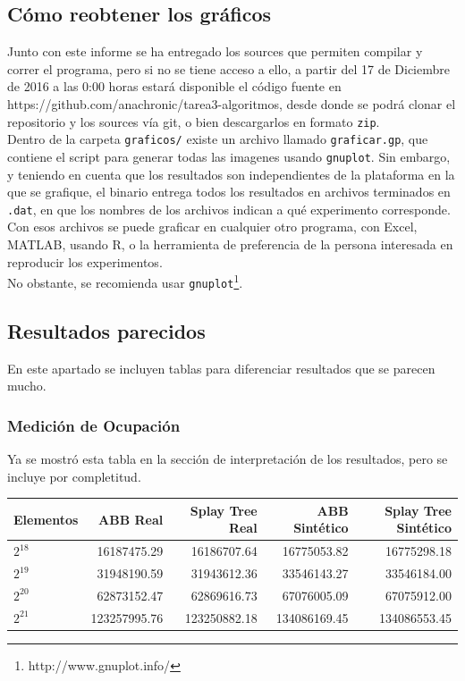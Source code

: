 \documentclass[12pt,letterpaper]{report}
\begin{document}
\subsection{Cómo reobtener los gráficos}
\label{subsec:gnuplot}
Junto con este informe se ha entregado los sources que permiten compilar y correr el programa, pero si no se tiene acceso a ello, a partir del 17 de Diciembre de 2016 a las 0:00 horas estará disponible el código fuente en https://github.com/anachronic/tarea3-algoritmos, desde donde se podrá clonar el repositorio y los sources vía git, o bien descargarlos en formato \texttt{zip}.\\

Dentro de la carpeta \texttt{graficos/} existe un archivo llamado \texttt{graficar.gp}, que contiene el script para generar todas las imagenes usando \texttt{gnuplot}. Sin embargo, y teniendo en cuenta que los resultados son independientes de la plataforma en la que se grafique, el binario entrega todos los resultados en archivos terminados en \texttt{.dat}, en que los nombres de los archivos indican a qué experimento corresponde. Con esos archivos se puede graficar en cualquier otro programa, con Excel, MATLAB, usando R, o la herramienta de preferencia de la persona interesada en reproducir los experimentos.\\

No obstante, se recomienda usar \texttt{gnuplot}\footnote{http://www.gnuplot.info/}.

\subsection{Resultados parecidos}
\label{subsec:anexo_tablas}

En este apartado se incluyen tablas para diferenciar resultados que se parecen mucho.

\subsubsection{Medición de Ocupación}
Ya se mostró esta tabla en la sección de interpretación de los resultados, pero se incluye por completitud.

\begin{center}
  \begin{tabular}{|l|r|r|r|r|}
    \hline
    Elementos & ABB Real & Splay Tree Real & ABB Sintético & Splay Tree Sintético\\ \hline
    $2^{18}$ & 16187475.29 & 16186707.64 & 16775053.82 & 16775298.18 \\ \hline
    $2^{19}$ & 31948190.59 & 31943612.36 & 33546143.27 & 33546184.00 \\ \hline
    $2^{20}$ & 62873152.47 & 62869616.73 & 67076005.09 & 67075912.00 \\ \hline
    $2^{21}$ & 123257995.76 & 123250882.18 & 134086169.45 & 134086553.45 \\ \hline
  \end{tabular}
\end{center}
\end{document}
